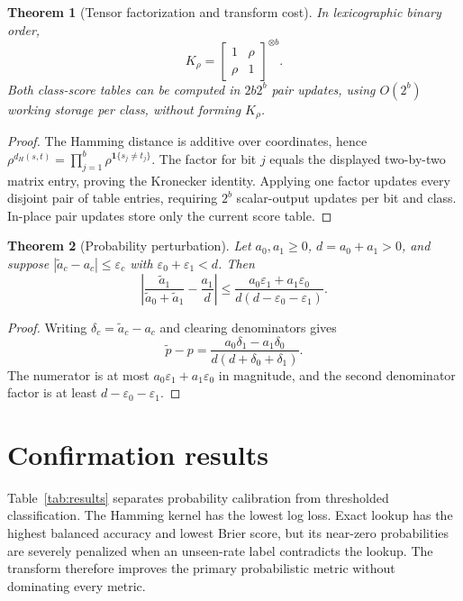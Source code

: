 \documentclass[10pt,letterpaper,twoside]{article}
\newtheorem{theorem}{Theorem}
\begin{document}
\begin{theorem}[Tensor factorization and transform cost]
\label{thm:fwht}
In lexicographic binary order,
\begin{equation}
 K_\rho=\begin{bmatrix}1&\rho\\\rho&1\end{bmatrix}^{\otimes b}.
\end{equation}
Both class-score tables can be computed in $2b2^b$ pair updates, using
$O(2^b)$ working storage per class, without forming $K_\rho$.
\end{theorem}
\begin{proof}
The Hamming distance is additive over coordinates, hence
$\rho^{d_H(s,t)}=\prod_{j=1}^b\rho^{\mathbf1\{s_j\ne t_j\}}$.
The factor for bit $j$ equals the displayed two-by-two matrix entry, proving
the Kronecker identity. Applying one factor updates every disjoint pair of
table entries, requiring $2^b$ scalar-output updates per bit and class.
In-place pair updates store only the current score table.
\end{proof}

\begin{theorem}[Probability perturbation]
\label{thm:normalization}
Let $a_0,a_1\ge0$, $d=a_0+a_1>0$, and suppose
$|\widetilde a_c-a_c|\le\varepsilon_c$ with
$\varepsilon_0+\varepsilon_1<d$. Then
\begin{equation}
 \left|\frac{\widetilde a_1}{\widetilde a_0+\widetilde a_1}
 -\frac{a_1}{d}\right|
 \le\frac{a_0\varepsilon_1+a_1\varepsilon_0}
 {d(d-\varepsilon_0-\varepsilon_1)}. \label{eq:normbound}
\end{equation}
\end{theorem}
\begin{proof}
Writing $\delta_c=\widetilde a_c-a_c$ and clearing denominators gives
\begin{equation}
 \widetilde p-p=\frac{a_0\delta_1-a_1\delta_0}
 {d(d+\delta_0+\delta_1)}.
\end{equation}
The numerator is at most $a_0\varepsilon_1+a_1\varepsilon_0$ in magnitude,
and the second denominator factor is at least
$d-\varepsilon_0-\varepsilon_1$.
\end{proof}

\section{Confirmation results}

Table~\ref{tab:results} separates probability calibration from thresholded
classification. The Hamming kernel has the lowest log loss. Exact lookup has
the highest balanced accuracy and lowest Brier score, but its near-zero
probabilities are severely penalized when an unseen-rate label contradicts
the lookup. The transform therefore improves the primary probabilistic metric
without dominating every metric.
\end{document}
